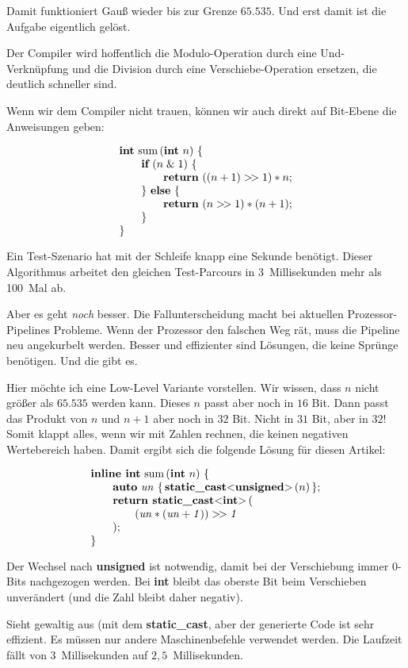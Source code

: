 \noindent Damit funktioniert Gauß wieder bis zur Grenze $65.535$.
Und erst damit ist die Aufgabe eigentlich gelöst.

Der Compiler wird hoffentlich die Modulo-Operation durch eine
Und-Verknüpfung und die Division durch eine
Verschiebe-Operation ersetzen, die deutlich schneller sind.

Wenn wir dem Compiler nicht trauen, können wir auch direkt
auf Bit-Ebene die Anweisungen geben:

$$\vbox{\halign{#\hfil\cr
{\bf int} sum$\,$({\bf int} $n$) $\{$\cr
\qquad{\bf if} ($n \mathrel\& 1$) $\{$\cr
\qquad\qquad{\bf return} $((n + 1) >\!> 1) * n$;\cr
\qquad$\}$ {\bf else} $\{$\cr
\qquad\qquad{\bf return} $(n >\!> 1) * (n + 1)$;\cr
\qquad$\}$\cr
$\}$\cr}}$$

\noindent Ein Test-Szenario hat mit der Schleife knapp eine Sekunde benötigt.
Dieser Algorithmus arbeitet den gleichen Test-Parcours in 3~Millisekunden
mehr als 100~Mal ab.

Aber es geht {\it noch\/} besser.
Die Fallunterscheidung macht bei aktuellen Prozessor-Pipelines
Probleme.
Wenn der Prozessor den falschen Weg rät, muss die
Pipeline neu angekurbelt werden.
Besser und effizienter sind Lösungen, die keine
Sprünge benötigen.
Und die gibt es.

Hier möchte ich eine Low-Level Variante vorstellen.
Wir wissen, dass $n$ nicht größer als $65.535$ werden
kann.
Dieses $n$ passt aber noch in $16$ Bit.
Dann passt das Produkt von $n$ und $n+1$ aber noch in
$32$ Bit.
Nicht in $31$ Bit, aber in $32$!
Somit klappt alles, wenn wir mit Zahlen rechnen, die
keinen negativen Wertebereich haben.
Damit ergibt sich die folgende Lösung für diesen Artikel:

$$\vbox{\halign{#\hfil\cr
{\bf inline int} sum$\,$({\bf int} $n$) $\{$\cr
\qquad{\bf auto} $\it un$ $\{\,${\bf static\_cast}<{\bf unsigned}>$\,$($n$)$\,\}$;\cr
\qquad{\bf return static\_cast}<{\bf int}>$\,$(\cr
\qquad\qquad$(\it un * (\it un + 1)) >\!> 1$\cr
\qquad);\cr
$\}$\cr}}$$

\noindent Der Wechsel nach {\bf unsigned} ist notwendig, damit
bei der Verschiebung immer $0$-Bits nachgezogen werden.
Bei {\bf int} bleibt das oberste Bit beim Verschieben unverändert
(und die Zahl bleibt daher negativ).

Sieht gewaltig aus (mit dem {\bf static\_cast}, aber
der generierte Code ist sehr effizient.
Es müssen nur andere Maschinenbefehle verwendet werden.
Die Laufzeit fällt von 3~Millisekunden auf $2{,}5$~Millisekunden.

